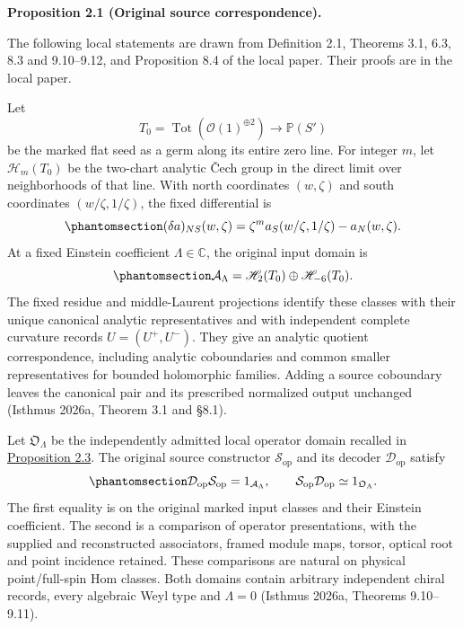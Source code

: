 \documentclass[
  english,
  11pt,
  reqno]{amsart}
\makeatletter
\newcommand{\pandocstatementheading}[1]{%
  \par\addpenalty{\@beginparpenalty}%
  \addvspace{.5\baselineskip plus .2\baselineskip minus .2\baselineskip}%
  {\normalfont\bfseries #1\par}%
  \nobreak\@afterindenttrue\@afterheading
}
\makeatother
\begin{document}
\pandocstatementheading{\protect{}\label{prop:original-two-class-local-input}Proposition 2.1 (Original source correspondence).}

The following local statements are drawn from Definition 2.1, Theorems
3.1, 6.3, 8.3 and 9.10--9.12, and Proposition 8.4 of the local paper.
Their proofs are in the local paper.

Let \[
T_0=\operatorname{Tot}(\mathcal O(1)^{\oplus2})
\longrightarrow\mathbb P(S')
\] be the marked flat seed as a germ along its entire zero line. For
integer \(m\), let \(\mathscr H_m(T_0)\) be the two-chart analytic Čech
group in the direct limit over neighborhoods of that line. With north
coordinates \((w,\zeta)\) and south coordinates \((w/\zeta,1/\zeta)\),
the fixed differential is
\begin{equation}\protect\phantomsection\label{eq:original-source-cech-differential}{
(\delta a)_{NS}(w,\zeta)
=\zeta^m a_S(w/\zeta,1/\zeta)-a_N(w,\zeta).
}\end{equation} At a fixed Einstein coefficient \(\Lambda\in\mathbb C\),
the original input domain is
\begin{equation}\protect\phantomsection\label{eq:original-source-local-domain}{
\mathcal A_\Lambda
=\mathscr H_2(T_0)\oplus\mathscr H_{-6}(T_0).
}\end{equation} The fixed residue and middle-Laurent projections
identify these classes with their unique canonical analytic
representatives and with independent complete curvature records
\(U=(U^+,U^-)\). They give an analytic quotient correspondence,
including analytic coboundaries and common smaller representatives for
bounded holomorphic families. Adding a source coboundary leaves the
canonical pair and its prescribed normalized output unchanged (Isthmus
2026a, Theorem 3.1 and §8.1).

Let \(\mathfrak O_\Lambda\) be the independently admitted local operator
domain recalled in
\hyperref[prop:independent-local-operator-input]{Proposition 2.3}. The
original source constructor \(\mathcal S_{\mathrm{op}}\) and its decoder
\(\mathcal D_{\mathrm{op}}\) satisfy
\begin{equation}\protect\phantomsection\label{eq:original-source-local-operator-inverses}{
\mathcal D_{\mathrm{op}}\mathcal S_{\mathrm{op}}
=1_{\mathcal A_\Lambda},
\qquad
\mathcal S_{\mathrm{op}}\mathcal D_{\mathrm{op}}
\simeq1_{\mathfrak O_\Lambda}.
}\end{equation} The first equality is on the original marked input
classes and their Einstein coefficient. The second is a comparison of
operator presentations, with the supplied and reconstructed associators,
framed module maps, torsor, optical root and point incidence retained.
These comparisons are natural on physical point/full-spin Hom classes.
Both domains contain arbitrary independent chiral records, every
algebraic Weyl type and \(\Lambda=0\) (Isthmus 2026a, Theorems
9.10--9.11).
\end{document}
